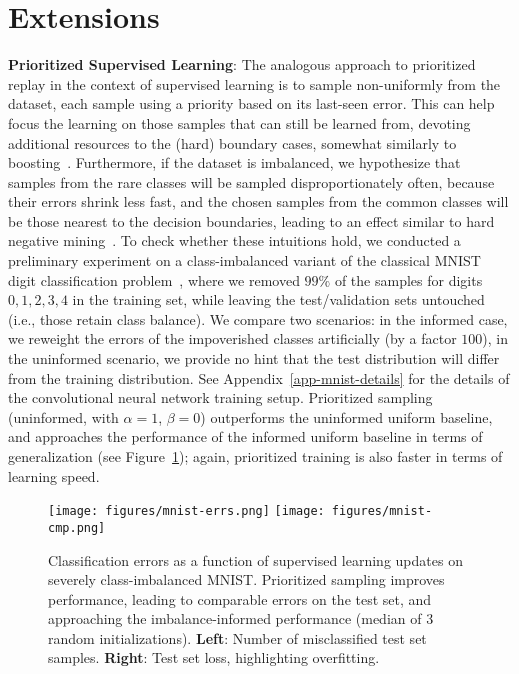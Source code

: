 \documentclass[a4paper]{article}
\begin{document}
\section{Extensions}


{\bf Prioritized Supervised Learning}:
The analogous approach to prioritized replay in the context of supervised learning 
is to sample non-uniformly from the dataset, each sample using a priority based on its last-seen error.
This can help focus the learning on those samples that
can still be learned from, devoting additional resources to the (hard) boundary cases, 
somewhat similarly to boosting~\citep{imbalance-ensemble}.
Furthermore, if the dataset is imbalanced, we hypothesize that samples from the rare classes 
will be sampled disproportionately often, because their errors shrink less fast,
and the chosen samples from the common classes will be those nearest to the decision boundaries,
leading to an effect similar to hard negative mining~\citep{hard-negative}.
To check whether these intuitions hold, we conducted a preliminary experiment 
on a class-imbalanced variant of the classical MNIST digit classification problem~\citep{mnist}, 
where we removed $99\%$ of the samples for digits $0,1,2,3,4$ in the training set,
while leaving the test/validation sets untouched (i.e., those retain class balance). 
We compare two scenarios: in the informed case, we reweight the errors of the impoverished classes artificially (by a factor $100$),
in the uninformed scenario, we provide no hint that the test distribution will  differ from the training distribution.
See Appendix~\ref{app-mnist-details} for the details of the convolutional neural network training setup.
Prioritized sampling (uninformed, with $\alpha=1$, $\beta=0$) outperforms the uninformed uniform baseline, 
and approaches the performance of the informed uniform baseline in terms of generalization (see Figure~\ref{fig-mnist});
again, prioritized training is also faster in terms of learning speed.


\begin{figure}
\vspace{-1.5em}
\centerline{
\texttt{[image: figures/mnist-errs.png]}
\texttt{[image: figures/mnist-cmp.png]}
}
\vspace{-1em}
\caption{
\label{fig-mnist}
Classification errors as a function of supervised learning updates on severely class-imbalanced MNIST. 
Prioritized sampling improves performance, leading to comparable errors on the test set,
and approaching the imbalance-informed performance (median of 3 random initializations). 
{\bf Left}: Number of misclassified test set samples. {\bf Right}: Test set loss, highlighting overfitting. 
\vspace{-1.5em}
}
\end{figure}
\end{document}
